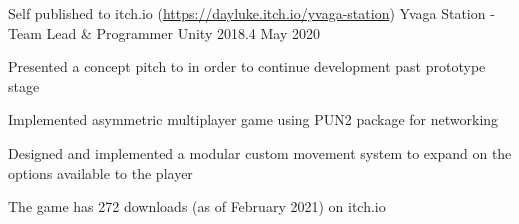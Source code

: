 

\begin{cventries}

    \cventry
    {Self published to itch.io (\href{https://dayluke.itch.io/yvaga-station}{https://dayluke.itch.io/yvaga-station})}
    {Yvaga Station - Team Lead \& Programmer}
    {Unity 2018.4}
    {May 2020}
    {
        \begin{cvitems}
            \item Presented a concept pitch to in order to continue development past prototype stage
            \item Implemented asymmetric multiplayer game using PUN2 package for networking
            \item Designed and implemented a modular custom movement system to expand on the options available to the player
            \item The game has 272 downloads (as of February 2021) on itch.io
        \end{cvitems}
    }
\end{cventries}